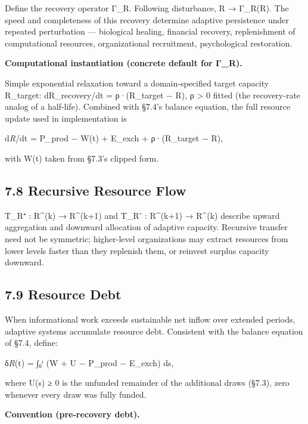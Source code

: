 \documentclass[
]{article}
\begin{document}
Define the recovery operator Γ\_R. Following disturbance, R → Γ\_R(R).
The speed and completeness of this recovery determine adaptive
persistence under repeated perturbation --- biological healing,
financial recovery, replenishment of computational resources,
organizational recruitment, psychological restoration.

\textbf{Computational instantiation (concrete default for Γ\_R).}

Simple exponential relaxation toward a domain-specified target capacity
R\_target: dR\_recovery/dt = ρ·(R\_target − R), ρ \textgreater{} 0
fitted (the recovery-rate analog of a half-life). Combined with §7.4's
balance equation, the full resource update used in implementation is

d\emph{R}/dt = P\_prod − W(t) + E\_exch + ρ·(R\_target − R),

with W(t) taken from §7.3's clipped form.

\hypertarget{recursive-resource-flow}{%
\subsection{7.8 Recursive Resource Flow}\label{recursive-resource-flow}}

T\_R⁺ : R\^{}(k) → R\^{}(k+1) and T\_R⁻ : R\^{}(k+1) → R\^{}(k) describe
upward aggregation and downward allocation of adaptive capacity.
Recursive transfer need not be symmetric; higher-level organizations may
extract resources from lower levels faster than they replenish them, or
reinvest surplus capacity downward.

\hypertarget{resource-debt}{%
\subsection{7.9 Resource Debt}\label{resource-debt}}

When informational work exceeds sustainable net inflow over extended
periods, adaptive systems accumulate resource debt. Consistent with the
balance equation of §7.4, define:

δ\emph{R}(t) = ∫₀ᵗ (W + U − P\_prod − E\_exch) ds,

where U(s) ≥ 0 is the unfunded remainder of the additional draws
(§7.3), zero whenever every draw was fully funded.

\textbf{Convention (pre-recovery debt).}
\end{document}
